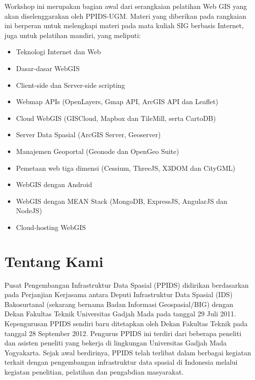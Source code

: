 \documentclass[letterpaper,10pt,english]{sphinxmanual}
\begin{document}
Workshop ini merupakan bagian awal dari serangkaian pelatihan Web GIS yang akan
diselenggarakan oleh PPIDS-UGM. Materi yang diberikan pada rangkaian ini
berperan untuk melengkapi materi pada mata kuliah SIG berbasis Internet,
juga untuk pelatihan mandiri, yang meliputi:
\begin{itemize}
\item {} 
Teknologi Internet dan Web

\item {} 
Dasar-dasar WebGIS

\item {} 
Client-side dan Server-side scripting

\item {} 
Webmap APIs (OpenLayers, Gmap API, ArcGIS API dan Leaflet)

\item {} 
Cloud WebGIS (GISCloud, Mapbox dan TileMill, serta CartoDB)

\item {} 
Server Data Spasial (ArcGIS Server, Geoserver)

\item {} 
Manajemen Geoportal (Geonode dan OpenGeo Suite)

\item {} 
Pemetaan web tiga dimensi (Cessium, ThreeJS, X3DOM dan CityGML)

\item {} 
WebGIS dengan Android

\item {} 
WebGIS dengan MEAN Stack (MongoDB, ExpressJS, AngularJS dan NodeJS)

\item {} 
Cloud-hosting WebGIS

\end{itemize}


\chapter{Tentang Kami}
\label{index:tentang-kami}\label{index:id2}
Pusat Pengembangan Infrastruktur Data Spasial (PPIDS) didirikan berdasarkan
pada Perjanjian Kerjasama antara Deputi Infrastruktur Data Spasial
(IDS) Bakosurtanal (sekarang bernama Badan Informasi Geospasial/BIG)
dengan Dekan Fakultas Teknik Universitas Gadjah Mada pada tanggal 29 Juli
2011. Kepengurusan PPIDS sendiri baru ditetapkan oleh Dekan Fakultas Teknik
pada tanggal 28 September 2012. Pengurus PPIDS ini terdiri dari beberapa
peneliti dan asisten peneliti yang bekerja di lingkungan Universitas Gadjah
Mada Yogyakarta. Sejak awal berdirinya, PPIDS telah terlibat dalam berbagai
kegiatan terkait dengan pengembangan infrastruktur data spasial di Indonesia
melalui kegiatan penelitian, pelatihan dan pengabdian masyarakat.
\end{document}
